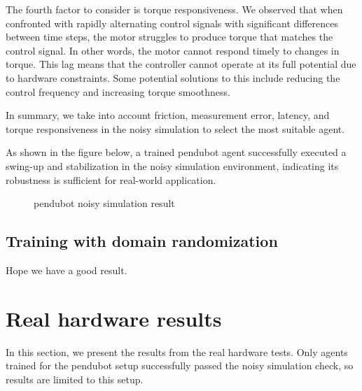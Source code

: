 The fourth factor to consider is torque responsiveness. We observed that when confronted with rapidly alternating control signals with significant differences between time steps, the motor struggles to produce torque that matches the control signal. In other words, the motor cannot respond timely to changes in torque. This lag means that the controller cannot operate at its full potential due to hardware constraints. Some potential solutions to this include reducing the control frequency and increasing torque smoothness.

In summary, we take into account friction, measurement error, latency, and torque responsiveness in the noisy simulation to select the most suitable agent.

As shown in the figure below, a trained pendubot agent successfully executed a swing-up and stabilization in the noisy simulation environment, indicating its robustness is sufficient for real-world application.

\begin{figure}[htbp]
    \centering
    \caption{pendubot noisy simulation result}
    \label{fig:image_b}
\end{figure}

\subsection{Training with domain randomization}
Hope we have a good result.


\section{Real hardware results}
In this section, we present the results from the real hardware tests. Only agents trained for the pendubot setup successfully passed the noisy simulation check, so results are limited to this setup. 

